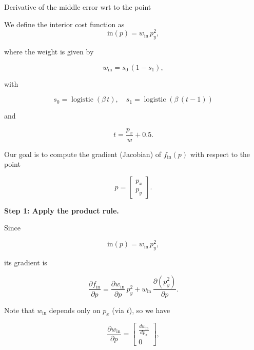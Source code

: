 \documentclass[11pt]{article}
\begin{document}
\begin{section}{Derivative of the middle error wrt to the point}

    We define the interior cost function as
    \begin{equation}
        {\mathrm{in}}(p) = w_{\mathrm{in}}\, p_y^2,
    \end{equation}

    where the weight is given by

    \begin{equation}
        w_{\mathrm{in}} = s_0\,(1-s_1),
    \end{equation}

    with

    \begin{equation}
        s_0 = \operatorname{logistic}(\beta\, t), \quad s_1 = \operatorname{logistic}(\beta\,(t-1))
    \end{equation}

    and

    \begin{equation}
        t = \frac{p_x}{w} + 0.5.
    \end{equation}

    Our goal is to compute the gradient (Jacobian) of \(f_{\mathrm{in}}(p)\) with respect to the point

    \begin{equation}
        p = \begin{bmatrix} p_x \\ p_y \end{bmatrix}.
    \end{equation}

    \textbf{Step 1: Apply the product rule.}

    Since

    \begin{equation}
        {\mathrm{in}}(p) = w_{\mathrm{in}}\, p_y^2,
    \end{equation}

    its gradient is

    \begin{equation}
        \frac{\partial f_{\mathrm{in}}}{\partial p}
        =\frac{\partial w_{\mathrm{in}}}{\partial p}\, p_y^2 + w_{\mathrm{in}}\, \frac{\partial (p_y^2)}{\partial p}.
    \end{equation}

    Note that \(w_{\mathrm{in}}\) depends only on \(p_x\) (via \(t\)), so we have

    \begin{equation}
        \frac{\partial w_{\mathrm{in}}}{\partial p} =
        \begin{bmatrix} \frac{d w_{\mathrm{in}}}{d p_x} \\[1ex] 0 \end{bmatrix},
    \end{equation}


\end{section}
\end{document}
